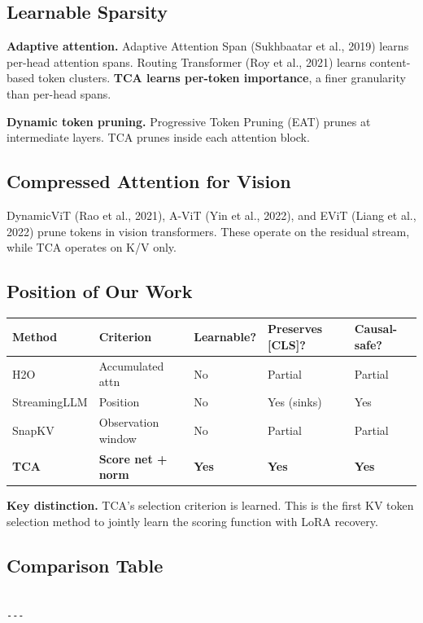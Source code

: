 \subsection{Learnable Sparsity}

\textbf{Adaptive attention.} Adaptive Attention Span (Sukhbaatar et al., 2019) 
learns per-head attention spans. Routing Transformer (Roy et al., 2021) 
learns content-based token clusters. \textbf{TCA learns per-token importance}, 
a finer granularity than per-head spans.

\textbf{Dynamic token pruning.} Progressive Token Pruning (EAT) prunes at 
intermediate layers. TCA prunes inside each attention block.

\subsection{Compressed Attention for Vision}

DynamicViT (Rao et al., 2021), A-ViT (Yin et al., 2022), and EViT (Liang 
et al., 2022) prune tokens in vision transformers. These operate on the 
residual stream, while TCA operates on K/V only.

\subsection{Position of Our Work}

\begin{table}[H]
\centering
\small
\begin{tabular}{lllll}
\toprule
\textbf{Method} & \textbf{Criterion} & \textbf{Learnable?} & \textbf{Preserves [CLS]?} & \textbf{Causal-safe?} \\
\midrule
H2O & Accumulated attn & No & Partial & Partial \\
StreamingLLM & Position & No & Yes (sinks) & Yes \\
SnapKV & Observation window & No & Partial & Partial \\
\textbf{TCA} & \textbf{Score net + norm} & \textbf{Yes} & \textbf{Yes} & \textbf{Yes} \\
\bottomrule
\end{tabular}
\end{table}

\textbf{Key distinction.} TCA's selection criterion is learned. This is the first 
KV token selection method to jointly learn the scoring function with LoRA 
recovery.



\subsection{Comparison Table}

\begin{lstlisting}

---
\end{lstlisting}